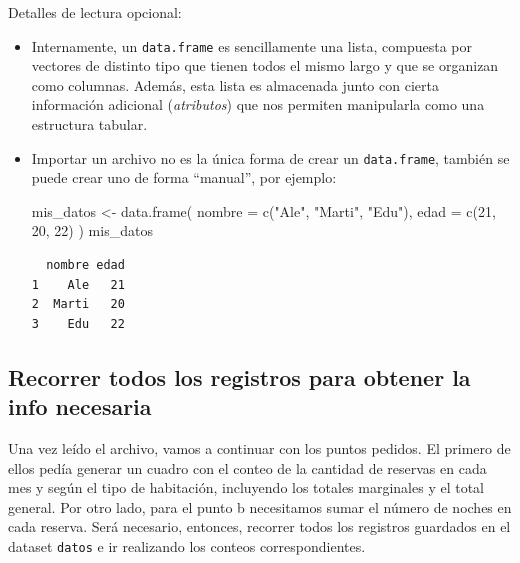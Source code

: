 \documentclass[
]{book}
\newenvironment{Shaded}{\begin{snugshade}}{\end{snugshade}}
\newcommand{\AttributeTok}[1]{\textcolor[rgb]{0.77,0.63,0.00}{#1}}
\newcommand{\DecValTok}[1]{\textcolor[rgb]{0.00,0.00,0.81}{#1}}
\newcommand{\FunctionTok}[1]{\textcolor[rgb]{0.00,0.00,0.00}{#1}}
\newcommand{\NormalTok}[1]{#1}
\newcommand{\OtherTok}[1]{\textcolor[rgb]{0.56,0.35,0.01}{#1}}
\newcommand{\StringTok}[1]{\textcolor[rgb]{0.31,0.60,0.02}{#1}}
\begin{document}
Detalles de lectura opcional:

\begin{itemize}
\item
  Internamente, un \texttt{data.frame} es sencillamente una lista, compuesta por vectores de distinto tipo que tienen todos el mismo largo y que se organizan como columnas. Además, esta lista es almacenada junto con cierta información adicional (\emph{atributos}) que nos permiten manipularla como una estructura tabular.
\item
  Importar un archivo no es la única forma de crear un \texttt{data.frame}, también se puede crear uno de forma ``manual'', por ejemplo:

\begin{Shaded}
\begin{Highlighting}[]
\NormalTok{mis\_datos }\OtherTok{\textless{}{-}} \FunctionTok{data.frame}\NormalTok{(}
    \AttributeTok{nombre =} \FunctionTok{c}\NormalTok{(}\StringTok{"Ale"}\NormalTok{, }\StringTok{"Marti"}\NormalTok{, }\StringTok{"Edu"}\NormalTok{),}
    \AttributeTok{edad =} \FunctionTok{c}\NormalTok{(}\DecValTok{21}\NormalTok{, }\DecValTok{20}\NormalTok{, }\DecValTok{22}\NormalTok{)}
\NormalTok{)}
\NormalTok{mis\_datos}
\end{Highlighting}
\end{Shaded}

\begin{verbatim}
  nombre edad
1    Ale   21
2  Marti   20
3    Edu   22
\end{verbatim}
\end{itemize}

\hypertarget{recorrer-todos-los-registros-para-obtener-la-info-necesaria}{%
\subsection{Recorrer todos los registros para obtener la info necesaria}\label{recorrer-todos-los-registros-para-obtener-la-info-necesaria}}

Una vez leído el archivo, vamos a continuar con los puntos pedidos. El primero de ellos pedía generar un cuadro con el conteo de la cantidad de reservas en cada mes y según el tipo de habitación, incluyendo los totales marginales y el total general. Por otro lado, para el punto b necesitamos sumar el número de noches en cada reserva. Será necesario, entonces, recorrer todos los registros guardados en el dataset \texttt{datos} e ir realizando los conteos correspondientes.
\end{document}
